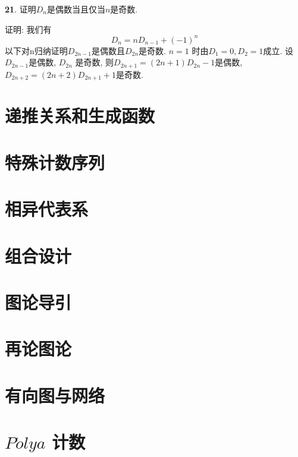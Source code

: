 \par \textbf{21}. 证明$D_n$是偶数当且仅当$n$是奇数.
\par 证明: 我们有
\begin{displaymath}
D_n=nD_{n-1}+(-1)^n
\end{displaymath}
以下对n归纳证明$D_{2n-1}$是偶数且$D_{2n}$是奇数. $n=1$ 时由$D_1=0,D_2=1$成立. 设$D_{2n-1}$是偶数, $D_{2n}$ 是奇数, 则$D_{2n+1}=(2n+1)D_{2n}-1$是偶数, $D_{2n+2}=(2n+2)D_{2n+1}+1$是奇数.

\section{递推关系和生成函数}

\section{特殊计数序列}

\section{相异代表系}

\section{组合设计}

\section{图论导引}

\section{再论图论}

\section{有向图与网络}

\section{$P\acute{o}lya$ 计数}


